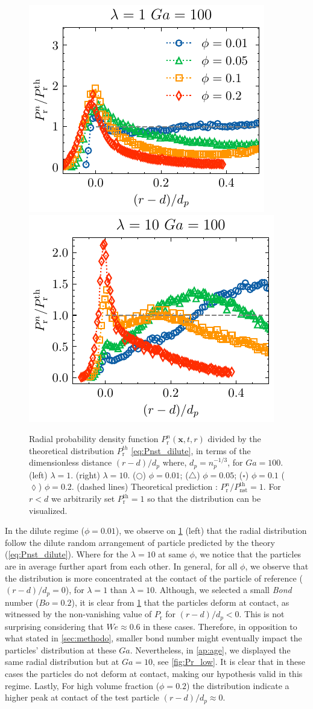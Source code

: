 \begin{figure}[h!]
    \centering
    \includegraphics[height=0.3\textwidth]{image/HOMOGENEOUS_NEW/Dist/Pr_l_1_Ga_100.pdf}
    \includegraphics[height=0.3\textwidth]{image/HOMOGENEOUS_NEW/Dist/Pr_l_10_Ga_100.pdf}
    \caption{Radial probability density function $P_\text{r}^n(\textbf{x},t,r)$ divided by the theoretical distribution $P_\text{r}^{th}$ \ref{eq:Pnst_dilute}, in terms of the dimensionless distance $(r-d)/d_p$ where, $d_p = n_p^{-1/3}$, for  $Ga = 100$.
    (left)  $\lambda = 1$.
    (right) $\lambda = 10$.
    ($\pmb\bigcirc$) $\phi = 0.01$; ($\pmb\triangle$) $ \phi = 0.05$; ($\pmb\square$) $\phi = 0.1$ ($\pmb\lozenge$) $\phi = 0.2$.
    (dashed lines) Theoretical prediction : $P_\text{r}^n/P_\text{nst}^\text{th} = 1$. 
    For $r<d$ we arbitrarily set $P_\text{r}^\text{th} = 1$ so that the distribution can be visualized.
    }
    \label{fig:Pr}
\end{figure}
In the dilute regime ($\phi = 0.01$), we observe on \ref{fig:Pr} (left) that the radial distribution follow the dilute random arrangement of particle predicted by the theory (\ref{eq:Pnst_dilute}). 
Where for the $\lambda = 10$ at same $\phi$, we notice that the particles are in average further apart from each other. 
In general, for all $\phi$, we observe that the distribution is more concentrated at the contact of the particle of reference ($(r-d)/d_p = 0$), for $\lambda = 1$ than $\lambda = 10$. 
Although, we selected a small \textit{Bond} number ($Bo = 0.2$), it is clear from \ref{fig:Pr} that the particles deform at contact, as witnessed by the non-vanishing value of $P_\text{r}$ for $(r-d)/d_p<0$.
This is not surprising considering that $We \approx 0.6$ in these cases. 
Therefore, in opposition to what stated in \ref{sec:methodo}, smaller bond number might eventually impact the particles' distribution at these $Ga$. 
Nevertheless, in \ref{ap:age}, we displayed the same radial distribution but at $Ga =10$, see \ref{fig:Pr_low}. 
It is clear that in these cases the particles do not deform at contact, making our hypothesis valid in this regime.
Lastly, For high volume fraction ($\phi=0.2$) the distribution indicate a higher peak at contact of the test particle $(r-d)/d_p \approx 0$. 

